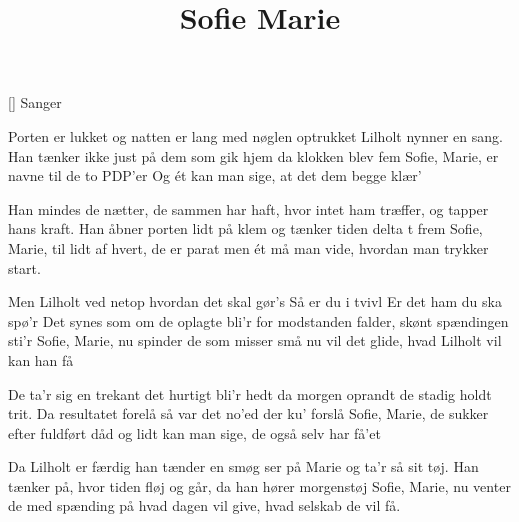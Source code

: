 \documentclass[a4paper,11pt]{article}
\title{Sofie Marie}
\author{}
\begin{document}
\maketitle

\begin{roles}
[] Sanger
\end{roles}

\begin{song}
  Porten er lukket
  og natten er lang
  med nøglen optrukket
  Lilholt nynner en sang.
  Han tænker ikke just på dem
  som gik hjem da klokken blev fem
  Sofie, Marie, er navne til de to PDP'er
  Og ét kan man sige, at det dem begge klær'

  Han mindes de nætter,
  de sammen har haft,
  hvor intet ham træffer,
  og tapper hans kraft.
  Han åbner porten lidt på klem
  og tænker tiden delta t frem
  Sofie, Marie, til lidt af hvert, de er parat
  men ét må man vide, hvordan man trykker start.

  Men Lilholt ved netop
  hvordan det skal gør's
  Så er du i tvivl
  Er det ham du ska spø'r
  Det synes som om de oplagte bli'r
  for modstanden falder, skønt spændingen sti'r
  Sofie, Marie, nu spinder de som misser små
  nu vil det glide, hvad Lilholt vil kan han få

  De ta'r sig en trekant
  det hurtigt bli'r hedt
  da morgen oprandt
  de stadig holdt trit.
  Da resultatet forelå
  så var det no'ed der ku' forslå
  Sofie, Marie, de sukker efter fuldført dåd
  og lidt kan man sige, de også selv har få'et

  Da Lilholt er færdig
  han tænder en smøg
  ser på Marie
  og ta'r så sit tøj.
  Han tænker på, hvor tiden fløj
  og går, da han hører morgenstøj
  Sofie, Marie, nu venter de med spænding på
  hvad dagen vil give, hvad selskab de vil få.
\end{song}
\end{document}
